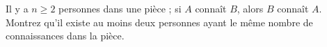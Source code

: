 Il y a $n \geq 2$ personnes dans une pièce ; si $A$ connaît $B$, alors $B$
connaît $A$. Montrez qu'il existe au moins deux
personnes ayant le même nombre de connaissances dans la pièce.
